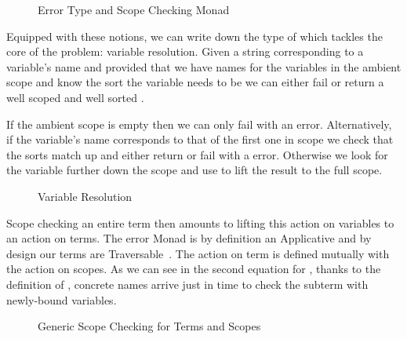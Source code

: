 \begin{figure}[h]
\begin{minipage}[t]{0.5\textwidth}
\end{minipage}
\begin{minipage}[t]{0.4\textwidth}
\end{minipage}
\caption{Error Type and Scope Checking Monad}\label{fig:scopemonad}
\end{figure}

Equipped with these notions, we can write down the type of 
which tackles the core of the problem: variable resolution. Given a string
corresponding to a variable's name and provided that we have names for the
variables in the ambient scope and know the sort the variable needs to be
we can either fail or return a well scoped and well sorted .

If the ambient scope is empty then we can only fail with an  error.
Alternatively, if the variable's name corresponds to that of the first one
in scope we check that the sorts match up and either return  or fail
with a  error. Otherwise we look for the variable further
down the scope and use  to lift the result to the full scope.

\begin{figure}[h]
\caption{Variable Resolution}
\end{figure}

Scope checking an entire term then amounts to lifting this action on
variables to an action on terms. The error Monad  is by definition
an Applicative and by design our terms are
Traversable~\cite{bird_paterson_1999,DBLP:journals/jfp/GibbonsO09}.
The action on term is defined mutually with the action on scopes.
As we can see in the second equation for , thanks to the
definition of , concrete names arrive just in time to
check the subterm with newly-bound variables.

\begin{figure}[h]
\caption{Generic Scope Checking for Terms and Scopes}
\end{figure}
